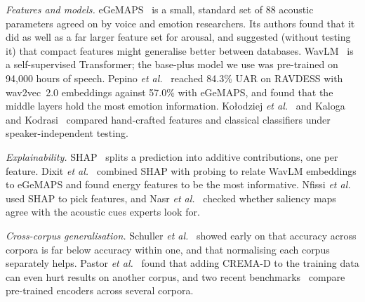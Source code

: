 \documentclass[conference]{IEEEtran}
\begin{document}
\emph{Features and models.} eGeMAPS~\cite{egemaps} is a small, standard set of 88 acoustic parameters agreed on by voice and emotion researchers. Its authors found that it did as well as a far larger feature set for arousal, and suggested (without testing it) that compact features might generalise better between databases. WavLM~\cite{wavlm} is a self-supervised Transformer; the base-plus model we use was pre-trained on 94{,}000 hours of speech. Pepino \emph{et al.}~\cite{pepino} reached 84.3\% UAR on RAVDESS with wav2vec~2.0 embeddings against 57.0\% with eGeMAPS, and found that the middle layers hold the most emotion information. Ko{\l}odziej \emph{et al.}~\cite{kolodziej} and Kaloga and Kodrasi~\cite{kaloga} compared hand-crafted features and classical classifiers under speaker-independent testing.

\emph{Explainability.} SHAP~\cite{shap} splits a prediction into additive contributions, one per feature. Dixit \emph{et al.}~\cite{dixit} combined SHAP with probing to relate WavLM embeddings to eGeMAPS and found energy features to be the most informative. Nfissi \emph{et al.}~\cite{nfissi} used SHAP to pick features, and Nasr \emph{et al.}~\cite{nasr} checked whether saliency maps agree with the acoustic cues experts look for.

\emph{Cross-corpus generalisation.} Schuller \emph{et al.}~\cite{schuller} showed early on that accuracy across corpora is far below accuracy within one, and that normalising each corpus separately helps. Pastor \emph{et al.}~\cite{pastor} found that adding CREMA-D to the training data can even hurt results on another corpus, and two recent benchmarks~\cite{phukan,ibrahim} compare pre-trained encoders across several corpora.
\end{document}
